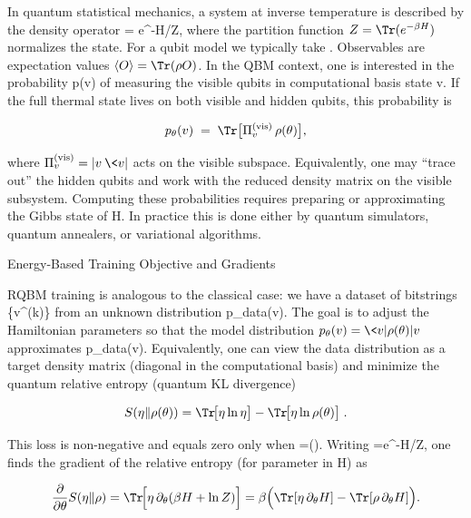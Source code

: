 In quantum statistical mechanics, a system at inverse temperature \beta is described by the density operator \rho = e^{-\beta H}/Z, where the partition function \(Z = \Tr(e^{-\beta H})\) normalizes the state.  For a qubit model we typically take .  Observables are expectation values \(\langle O\rangle = \Tr(\rho O)\). In the QBM context, one is interested in the probability p(v) of measuring the visible qubits in computational basis state v.  If the full thermal state lives on both visible and hidden qubits, this probability is

\[

p_\theta(v) \;=\; \Tr\bigl[\Pi_v^{(\text{vis})}\,\rho(\theta)\bigr],

\]

where \(\Pi_v^{(\text{vis})}=|v\>\<v|\) acts on the visible subspace.  Equivalently, one may “trace out” the hidden qubits and work with the reduced density matrix on the visible subsystem.  Computing these probabilities requires preparing or approximating the Gibbs state of H.  In practice this is done either by quantum simulators, quantum annealers, or variational algorithms.





Energy-Based Training Objective and Gradients





RQBM training is analogous to the classical case: we have a dataset of bitstrings \{v^{(k)}\} from an unknown distribution p_{\rm data}(v).  The goal is to adjust the Hamiltonian parameters \theta so that the model distribution \(p_\theta(v)=\<v|\rho(\theta)|v\>\) approximates p_{\rm data}(v).  Equivalently, one can view the data distribution as a target density matrix \eta (diagonal in the computational basis) and minimize the quantum relative entropy (quantum KL divergence)

\[

S(\eta\Vert \rho(\theta)) = \Tr\!\bigl[\eta\ln\eta\bigr] - \Tr\!\bigl[\eta\ln\rho(\theta)\bigr] \;.

\]

This loss is non-negative and equals zero only when \eta=\rho(\theta).  Writing \rho=e^{-H}/Z, one finds the gradient of the relative entropy (for parameter \theta in H) as

\[

\frac{\partial}{\partial\theta} S(\eta\Vert\rho)

= \Tr\!\Bigl[\eta\,\partial_\theta(\beta H + \ln Z)\Bigr]

= \beta\Bigl(\Tr[\eta\,\partial_\theta H] - \Tr[\rho\,\partial_\theta H]\Bigr).

\]


